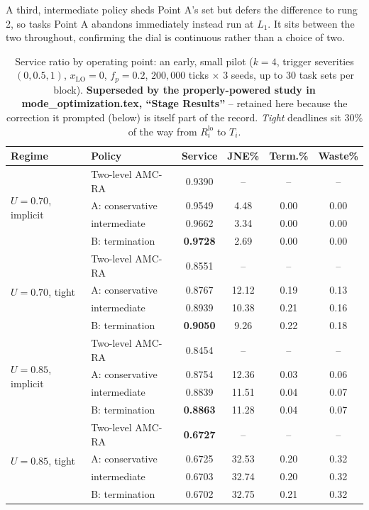 \documentclass{article}
\begin{document}
\noindent A third, intermediate policy sheds Point A's set but defers the
difference to rung 2, so tasks Point A abandons immediately instead run at
$L_1$. It sits between the two throughout, confirming the dial is continuous
rather than a choice of two.

\begin{table}[h]
\centering
\caption{Service ratio by operating point: an early, small pilot
($k=4$, trigger severities $(0, 0.5, 1)$, $x_{\mathrm{LO}} = 0$,
$f_p = 0.2$, $200{,}000$ ticks $\times$ 3 seeds, up to 30 task sets per
block). \textbf{Superseded by the properly-powered study in
mode\_optimization.tex, ``Stage Results''} -- retained here because the
correction it prompted (below) is itself part of the record. \emph{Tight}
deadlines sit $30\%$ of the way from $R_i^{\mathrm{lo}}$ to $T_i$.}
\label{tab:operating-points}
\begin{tabular}{llcccc}
\toprule
Regime & Policy & Service & JNE\% & Term.\% & Waste\% \\
\midrule
\multirow{4}{*}{$U=0.70$, implicit}
 & Two-level AMC-RA   & 0.9390 & --    & --   & --   \\
 & A: conservative    & 0.9549 & 4.48  & 0.00 & 0.00 \\
 & \quad intermediate & 0.9662 & 3.34  & 0.00 & 0.00 \\
 & B: termination     & \textbf{0.9728} & 2.69 & 0.00 & 0.00 \\
\midrule
\multirow{4}{*}{$U=0.70$, tight}
 & Two-level AMC-RA   & 0.8551 & --    & --   & --   \\
 & A: conservative    & 0.8767 & 12.12 & 0.19 & 0.13 \\
 & \quad intermediate & 0.8939 & 10.38 & 0.21 & 0.16 \\
 & B: termination     & \textbf{0.9050} & 9.26 & 0.22 & 0.18 \\
\midrule
\multirow{4}{*}{$U=0.85$, implicit}
 & Two-level AMC-RA   & 0.8454 & --    & --   & --   \\
 & A: conservative    & 0.8754 & 12.36 & 0.03 & 0.06 \\
 & \quad intermediate & 0.8839 & 11.51 & 0.04 & 0.07 \\
 & B: termination     & \textbf{0.8863} & 11.28 & 0.04 & 0.07 \\
\midrule
\multirow{4}{*}{$U=0.85$, tight}
 & Two-level AMC-RA   & \textbf{0.6727} & -- & -- & -- \\
 & A: conservative    & 0.6725 & 32.53 & 0.20 & 0.32 \\
 & \quad intermediate & 0.6703 & 32.74 & 0.20 & 0.32 \\
 & B: termination     & 0.6702 & 32.75 & 0.21 & 0.32 \\
\bottomrule
\end{tabular}
\end{table}
\end{document}

